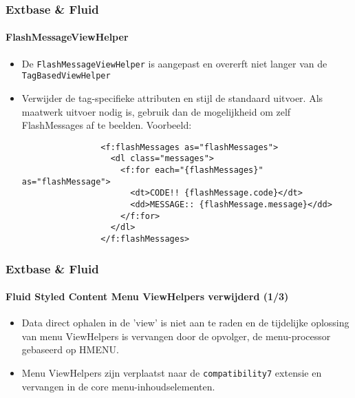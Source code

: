 
\begin{frame}[fragile]
	\frametitle{Extbase \& Fluid}
	\framesubtitle{FlashMessageViewHelper}

	\lstset{basicstyle=\tiny\ttfamily}

	\begin{itemize}
		\item De \texttt{FlashMessageViewHelper} is aangepast en overerft niet langer van de \texttt{TagBasedViewHelper}

		\item Verwijder de tag-specifieke attributen en stijl de standaard uitvoer. Als maatwerk uitvoer nodig is, gebruik
			dan de mogelijkheid om zelf FlashMessages af te beelden. Voorbeeld:

			\begin{lstlisting}
				<f:flashMessages as="flashMessages">
				  <dl class="messages">
				    <f:for each="{flashMessages}" as="flashMessage">
				      <dt>CODE!! {flashMessage.code}</dt>
				      <dd>MESSAGE:: {flashMessage.message}</dd>
				    </f:for>
				  </dl>
				</f:flashMessages>
			\end{lstlisting}

	\end{itemize}

\end{frame}


\begin{frame}[fragile]
	\frametitle{Extbase \& Fluid}
	\framesubtitle{Fluid Styled Content Menu ViewHelpers verwijderd (1/3)}

	\begin{itemize}
		\item Data direct ophalen in de 'view' is niet aan te raden en de tijdelijke oplossing
			van menu ViewHelpers is vervangen door de opvolger, de menu-processor
			gebaseerd op HMENU.

		\item Menu ViewHelpers zijn verplaatst naar de \texttt{compatibility7}
			extensie en vervangen in de core menu-inhoudselementen.

	\end{itemize}

\end{frame}


